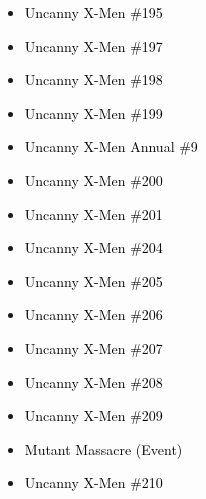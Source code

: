 \documentclass[12pt]{article}
\newcommand{\checkbox}{\raisebox{0.0ex}{\fbox{\rule{0ex}{1.5ex} \rule{1.5ex}{0ex}}}}
\begin{document}
\vspace{0.3cm}
\noindent
\begin{tcolorbox}[
  colback=white!95!gray,
  colframe=black,
  width=\textwidth,
  arc=4mm,
  auto outer arc,
  boxrule=0.8pt,
  left=8pt,right=8pt,top=8pt,bottom=8pt
]
\begin{itemize}[left=0pt,label={\checkbox}]
  \item \textcolor{black}{Uncanny X-Men \#195}
  \item \textcolor{black}{Uncanny X-Men \#197}
  \item \textcolor{black}{Uncanny X-Men \#198}
  \item \textcolor{black}{Uncanny X-Men \#199}
  \item \textcolor{black}{Uncanny X-Men Annual \#9}
  \item \textcolor{black}{Uncanny X-Men \#200}
  \item \textcolor{black}{Uncanny X-Men \#201}
  \item \textcolor{black}{Uncanny X-Men \#204}
  \item \textcolor{black}{Uncanny X-Men \#205}
  \item \textcolor{black}{Uncanny X-Men \#206}
  \item \textcolor{black}{Uncanny X-Men \#207}
  \item \textcolor{black}{Uncanny X-Men \#208}
  \item \textcolor{black}{Uncanny X-Men \#209}
  \item \textcolor{black}{Mutant Massacre (Event)}
  \item \textcolor{black}{Uncanny X-Men \#210}
\end{itemize}
\end{tcolorbox}

\newpage
{}
\end{document}
